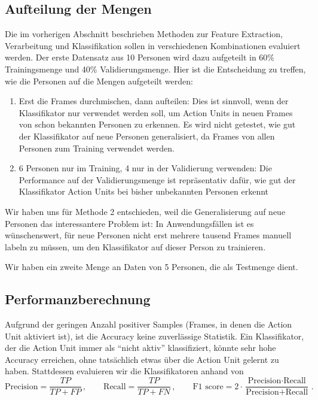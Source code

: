 \subsection{Aufteilung der Mengen}
Die im vorherigen Abschnitt beschrieben Methoden zur Feature Extraction,
Verarbeitung und Klassifikation sollen in verschiedenen Kombinationen evaluiert
werden. Der erste Datensatz aus 10 Personen wird dazu aufgeteilt in 60\%
Trainingsmenge und 40\% Validierungsmenge. Hier ist die Entscheidung zu treffen,
wie die Personen auf die Mengen aufgeteilt werden:
\begin{enumerate}
\item Erst die Frames durchmischen, dann aufteilen: Dies ist sinnvoll, wenn der
  Klassifikator nur verwendet werden soll, um Action Units in neuen Frames von schon bekannten
  Personen zu erkennen. Es wird nicht getestet, wie gut der Klassifikator auf
  neue Personen generalisiert, da Frames von allen Personen zum Training verwendet werden.
  \item 6 Personen nur im Training, 4 nur in der Validierung verwenden: Die
    Performance auf der Validierungsmenge ist repräsentativ dafür, wie gut der
    Klassifikator Action Units bei bisher unbekannten Personen erkennt
\end{enumerate}
Wir haben uns für Methode 2 entschieden, weil
die Generalisierung auf neue Personen das interessantere Problem ist: In
Anwendungsfällen ist es wünschenswert, für neue Personen nicht erst mehrere
tausend Frames manuell labeln zu müssen, um den Klassifikator auf dieser Person
zu trainieren.

Wir haben ein zweite Menge an Daten von 5 Personen, die als Testmenge dient.
\subsection{Performanzberechnung}
Aufgrund der geringen Anzahl positiver Samples (Frames, in denen die Action Unit
aktiviert ist), ist die Accuracy keine zuverlässige Statistik. Ein Klassifikator,
der die Action Unit immer als "`nicht aktiv"' klassifiziert, könnte sehr hohe
Accuracy erreichen, ohne tatsächlich etwas über die Action Unit gelernt zu haben.
Stattdessen evaluieren wir die Klassifikatoren anhand von
\begin{equation*}
\text{Precision}=\frac{TP}{TP+FP}\,, \qquad \text{Recall}=\frac{TP}{TP+FN}\,, \qquad \text{F1 score}=2\cdot\frac{\text{Precision}\cdot\text{Recall}}{\text{Precision}+\text{Recall}}\,.
\end{equation*}


